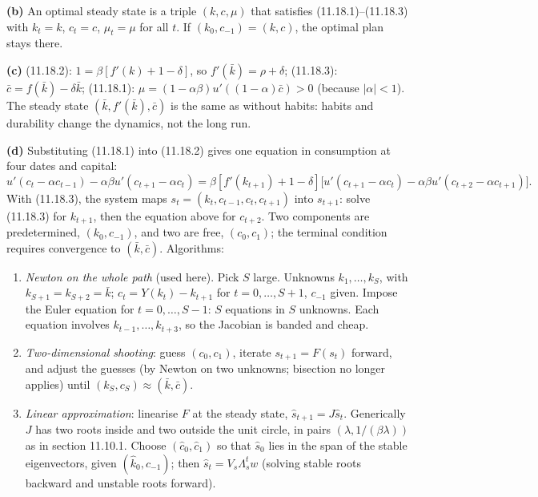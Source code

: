 \documentclass[12pt, letterpaper]{article}
\newcommand{\kb}{\bar k}
\newcommand{\cb}{\bar c}
\begin{document}
\begin{tcolorbox}[evenbox,title={Exercise 11.18 \quad Habits and durability}]
\textbf{(b)} An optimal steady state is a triple $(k,c,\mu)$ that satisfies (11.18.1)--(11.18.3) with $k_t=k$, $c_t=c$,
$\mu_t=\mu$ for all $t$. If $(k_0,c_{-1})=(k,c)$, the optimal plan stays there.

\textbf{(c)} (11.18.2): $1=\beta[f'(k)+1-\delta]$, so $f'(\kb)=\rho+\delta$; (11.18.3): $\cb=f(\kb)-\delta\kb$;
(11.18.1): $\mu=(1-\alpha\beta)u'((1-\alpha)\cb)>0$ (because $|\alpha|<1$). The steady state $(\kb,f'(\kb),\cb)$ is the same
as without habits: habits and durability change the dynamics, not the long run.

\textbf{(d)} Substituting (11.18.1) into (11.18.2) gives one equation in consumption at four dates and capital:
\[
u'(c_t-\alpha c_{t-1})-\alpha\beta u'(c_{t+1}-\alpha c_t)=\beta[f'(k_{t+1})+1-\delta]\big[u'(c_{t+1}-\alpha c_t)-\alpha\beta
u'(c_{t+2}-\alpha c_{t+1})\big].
\]
With (11.18.3), the system maps $s_t=(k_t,c_{t-1},c_t,c_{t+1})$ into $s_{t+1}$: solve (11.18.3) for $k_{t+1}$, then the
equation above for $c_{t+2}$. Two components are predetermined, $(k_0,c_{-1})$, and two are free, $(c_0,c_1)$; the
terminal condition requires convergence to $(\kb,\cb)$. Algorithms:
\begin{enumerate}[label=\arabic*.]
\item \emph{Newton on the whole path} (used here). Pick $S$ large. Unknowns $k_1,\dots,k_S$, with $k_{S+1}=k_{S+2}=\kb$;
$c_t=Y(k_t)-k_{t+1}$ for $t=0,\dots,S+1$, $c_{-1}$ given. Impose the Euler equation for $t=0,\dots,S-1$: $S$ equations in
$S$ unknowns. Each equation involves $k_{t-1},\dots,k_{t+3}$, so the Jacobian is banded and cheap.
\item \emph{Two-dimensional shooting}: guess $(c_0,c_1)$, iterate $s_{t+1}=F(s_t)$ forward, and adjust the guesses (by
Newton on two unknowns; bisection no longer applies) until $(k_S,c_S)\approx(\kb,\cb)$.
\item \emph{Linear approximation}: linearise $F$ at the steady state, $\hat s_{t+1}=J\hat s_t$. Generically $J$ has two
roots inside and two outside the unit circle, in pairs $(\lambda,1/(\beta\lambda))$ as in section 11.10.1. Choose
$(\hat c_0,\hat c_1)$ so that $\hat s_0$ lies in the span of the stable eigenvectors, given $(\hat k_0,\hat c_{-1})$; then
$\hat s_t=V_s\Lambda_s^tw$ (solving stable roots backward and unstable roots forward).
\end{enumerate}


\end{tcolorbox}
\end{document}
